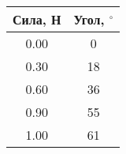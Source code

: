 \begin{tabular}{|c|c|}
\hline
Сила, Н & Угол, $^\circ$ \\ \hline
0.00 & 0 \\ \hline
0.30 & 18 \\ \hline
0.60 & 36 \\ \hline
0.90 & 55 \\ \hline
1.00 & 61 \\ \hline
\end{tabular}
